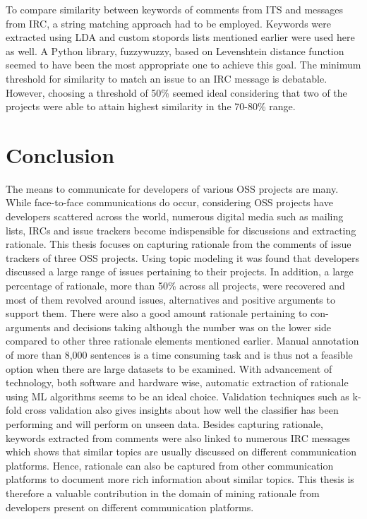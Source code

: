 \documentclass[a4paper,12pt,twoside]{report}
\begin{document}
\newline \newline
To compare similarity between keywords of comments from ITS and messages from IRC, a string matching approach had to be employed. Keywords were extracted using LDA and custom stopords lists mentioned earlier were used here as well. A Python library, fuzzywuzzy, based on Levenshtein distance function seemed to have been the most appropriate one to achieve this goal. The minimum threshold for similarity to match an issue to an IRC message is debatable. However, choosing a threshold of 50\% seemed ideal considering that two of the projects were able to attain highest similarity in the 70-80\% range. 

\section{Conclusion}
The means to communicate for developers of various OSS projects are many. While face-to-face communications do occur, considering OSS projects have developers scattered across the world, numerous digital media such as mailing lists, IRCs and issue trackers become indispensible for discussions and extracting rationale. This thesis focuses on capturing rationale from the comments of issue trackers of three OSS projects. Using topic modeling it was found that developers discussed a large range of issues pertaining to their projects. In addition, a large percentage of rationale, more than 50\% across all projects, were recovered and most of them revolved around issues, alternatives and positive arguments to support them. There were also a good amount rationale pertaining to con-arguments and decisions taking although the number was on the lower side compared to other three rationale elements mentioned earlier. 
\newline \newline
Manual annotation of more than 8,000 sentences is a time consuming task and is thus not a feasible option when there are large datasets to be examined. With advancement of technology, both software and hardware wise, automatic extraction of rationale using ML algorithms seems to be an ideal choice. Validation techniques such as k-fold cross validation also gives insights about how well the classifier has been performing and will perform on unseen data. 
\newline \newline
Besides capturing rationale, keywords extracted from comments were also linked to numerous IRC messages which shows that similar topics are usually discussed on different communication platforms. Hence, rationale can also be captured from other communication platforms to document more rich information about similar topics. This thesis is therefore a valuable contribution in the domain of mining rationale from developers present on different communication platforms. 
\end{document}
